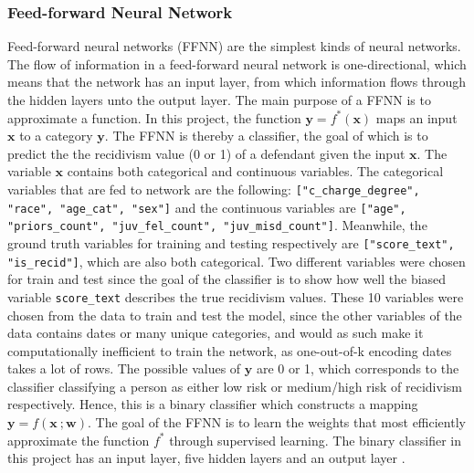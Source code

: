 \documentclass[11pt, fleqn, titlepage]{article}
\begin{document}
	\subsubsection{Feed-forward Neural Network}
	Feed-forward neural networks (FFNN) are the simplest kinds of neural networks. The flow of information in a feed-forward neural network is one-directional, which means that the network has an input layer, from which information flows through the hidden layers unto the output layer. The main purpose of a FFNN is to approximate a function. In this project, the function $ \mathbf{y} = f^*(\mathbf{x}) $ maps an input $ \mathbf x $ to a category $ \mathbf y $. The FFNN is thereby a classifier, the goal of which is to predict the the recidivism value (0 or 1) of a defendant given the input $ \mathbf x $. The variable $ \mathbf x $ contains both categorical and continuous variables. The categorical variables that are fed to network are the following: \texttt{["c\_charge\_degree", "race", "age\_cat", "sex"]} and the continuous variables are \texttt{["age", "priors\_count", "juv\_fel\_count", "juv\_misd\_count"]}. Meanwhile, the ground truth variables for training and testing respectively are \texttt{["score\_text", "is\_recid"]}, which are also both categorical. Two different variables were chosen for train and test since the goal of the classifier is to show how well the biased variable \texttt{score\_text} describes the true recidivism values. These 10 variables were chosen from the data to train and test the model, since the other variables of the data contains dates or many unique categories, and would as such make it computationally inefficient to train the network, as one-out-of-k encoding dates takes a lot of rows. The possible values of $ \mathbf y $ are 0 or 1, which corresponds to the classifier classifying a person as either low risk or medium/high risk of recidivism respectively. Hence, this is a binary classifier which constructs a mapping $ \mathbf y = f(\mathbf x \ ; \mathbf w) $. The goal of the FFNN is to learn the weights that most efficiently approximate the function $ f^* $ through supervised learning. The binary classifier in this project has an input layer, five hidden layers and an output layer \cite{dl}.
	
\end{document}
